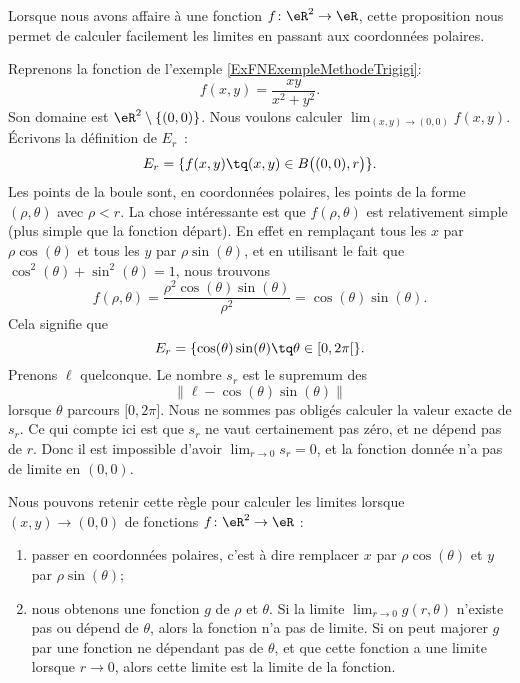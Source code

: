 Lorsque nous avons affaire à une fonction $f\colon \eR^2\to \eR$, cette proposition nous permet de calculer facilement les limites en passant aux coordonnées polaires.

\begin{example}		\label{ExempleMethodeTrigigi}
	Reprenons la fonction de l'exemple \ref{ExFNExempleMethodeTrigigi}:
	\begin{equation}
		f(x,y)=\frac{ xy }{ x^2+y^2 }.
	\end{equation}
	Son domaine est $\eR^2\setminus\{ (0,0) \}$. Nous voulons calculer $\lim_{(x,y)\to(0,0)}f(x,y)$. Écrivons la définition de $E_r$~:
	\begin{equation}
		E_r=\{ f(x,y)\tq (x,y)\in B\big( (0,0),r \big) \}.
	\end{equation}
	Les points de la boule sont, en coordonnées polaires, les points de la forme $(\rho,\theta)$ avec $\rho<r$. La chose intéressante est que $f(\rho,\theta)$ est relativement simple (plus simple que la fonction départ). En effet en remplaçant tous les $x$ par $\rho\cos(\theta)$ et tous les $y$ par $\rho\sin(\theta)$, et en utilisant le fait que $\cos^2(\theta)+\sin^2(\theta)=1$, nous trouvons
	\begin{equation}		\label{Eq2807fpolairerhodeuxcossin}
		f(\rho,\theta)=\frac{ \rho^2\cos(\theta)\sin(\theta) }{ \rho^2 }=\cos(\theta)\sin(\theta).
	\end{equation}
	Cela signifie que
	\begin{equation}
		E_r=\{ \cos(\theta)\sin(\theta)\tq\theta\in\mathopen[ 0 , 2\pi [ \}.
	\end{equation}
	Prenons $\ell$ quelconque. Le nombre $s_r$ est le supremum des
	\begin{equation}
		\| \ell-\cos(\theta)\sin(\theta) \|
	\end{equation}
	lorsque $\theta$ parcours $\mathopen[ 0 , 2\pi \mathclose]$. Nous ne sommes pas obligés calculer la valeur exacte de $s_r$. Ce qui compte ici est que $s_r$ ne vaut certainement pas zéro, et ne dépend pas de $r$. Donc il est impossible d'avoir $\lim_{r\to 0} s_r=0$, et la fonction donnée n'a pas de limite en $(0,0)$.
\end{example}

Nous pouvons retenir cette règle pour calculer les limites lorsque $(x,y)\to(0,0)$ de fonctions $f\colon \eR^2\to \eR$ :
\begin{enumerate}
	\item
		passer en coordonnées polaires, c'est à dire remplacer $x$ par $\rho\cos(\theta)$ et $y$ par $\rho\sin(\theta)$;
	\item
		nous obtenons une fonction $g$ de $\rho$ et $\theta$. Si la limite $\lim_{r\to 0} g(r,\theta)$ n'existe pas ou dépend de $\theta$, alors la fonction n'a pas de limite. Si on peut majorer $g$ par une fonction ne dépendant pas de $\theta$, et que cette fonction a une limite lorsque $r\to 0$, alors cette limite est la limite de la fonction.
\end{enumerate}

